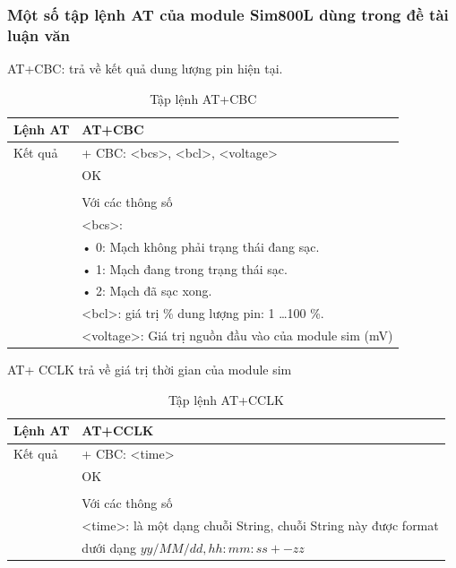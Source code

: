 
\subsubsection*{Một số tập lệnh AT của module Sim800L dùng trong đề tài luận văn}


AT+CBC: trả về kết quả dung lượng pin hiện tại.
\begin{table}[H]
	\label{table:at+cbc}
	\begin{tabular}{|l|l|}
		\hline
		Lệnh AT & AT+CBC \\ \hline
		Kết quả  & 
		+ CBC: <bcs>, <bcl>, <voltage> \\
		&OK \\
		& \\
		& Với các thông số \\
		& \hspace{0.5cm} <bcs>: \\
		& \hspace{2cm} • 0: Mạch không phải trạng thái đang sạc. \\
		& \hspace{2cm} • 1: Mạch đang trong trạng thái sạc. \\
		& \hspace{2cm} • 2: Mạch đã sạc xong. \\
		& \hspace{0.5cm} <bcl>: giá trị \% dung lượng pin: 1 …100 \%. \\
		& \hspace{0.5cm} <voltage>: Giá trị nguồn đầu vào của module sim (mV) \\\hline
	\end{tabular}
	\caption[Tập lệnh AT+CBC: kết quả dung lượng pin hiện tại]{Tập lệnh AT+CBC}
\end{table}



AT+ CCLK trả về giá trị thời gian của module sim
\begin{table}[H]
	\label{table:at+cclk}
	\begin{tabular}{|l|l|}
		\hline
		Lệnh AT & AT+CCLK \\ \hline
		Kết quả  & 
		+ CBC: <time> \\
		&OK \\
		& \\
		& Với các thông số \\
		& \hspace{0.5cm}<time>: là một dạng chuỗi String, chuỗi String này được format\\
		& \hspace{0.5cm} dưới dạng $yy/MM/dd, hh:mm:ss+-zz$ \\\hline
	\end{tabular}
	
	\caption[Tập lệnh AT+CCLK: trả về giá trị thời gian của module sim]{Tập lệnh AT+CCLK}
\end{table}


